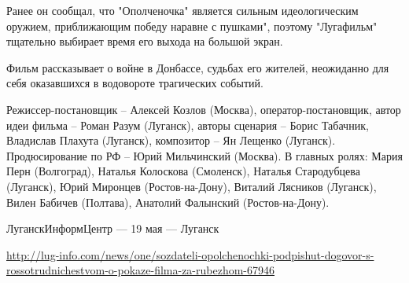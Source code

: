 Ранее он сообщал, что "Ополченочка" является сильным идеологическим оружием,
приближающим победу наравне с пушками", поэтому "Лугафильм" тщательно выбирает
время его выхода на большой экран. 

Фильм рассказывает о войне в Донбассе, судьбах его жителей, неожиданно для себя
оказавшихся в водовороте трагических событий.

Режиссер-постановщик – Алексей Козлов (Москва), оператор-постановщик, автор
идеи фильма – Роман Разум (Луганск), авторы сценария – Борис Табачник,
Владислав Плахута (Луганск), композитор – Ян Лещенко (Луганск). Продюсирование
по РФ – Юрий Мильчинский (Москва). В главных ролях: Мария Перн (Волгоград),
Наталья Колоскова (Смоленск), Наталья Стародубцева (Луганск), Юрий Миронцев
(Ростов-на-Дону), Виталий Лясников (Луганск), Вилен Бабичев (Полтава), Анатолий
Фалынский (Ростов-на-Дону). 

ЛуганскИнформЦентр — 19 мая — Луганск

\url{http://lug-info.com/news/one/sozdateli-opolchenochki-podpishut-dogovor-s-rossotrudnichestvom-o-pokaze-filma-za-rubezhom-67946}
